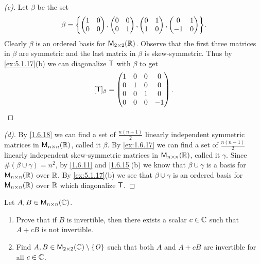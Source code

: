 \begin{proof}[(c)]
  Let \(\beta\) be the set
  \[
    \beta = \set{\begin{pmatrix}
        1 & 0 \\
        0 & 0
      \end{pmatrix}, \begin{pmatrix}
        0 & 0 \\
        0 & 1
      \end{pmatrix}, \begin{pmatrix}
        0 & 1 \\
        1 & 0
      \end{pmatrix}, \begin{pmatrix}
        0  & 1 \\
        -1 & 0
      \end{pmatrix}}.
  \]
  Clearly \(\beta\) is an ordered basis for \(\ms[2][2][\R]\).
  Observe that the first three matrices in \(\beta\) are symmetric and the last matrix in \(\beta\) is skew-symmetric.
  Thus by \cref{ex:5.1.17}(b) we can diagonalize \(\mathsf{T}\) with \(\beta\) to get
  \[
    [\mathsf{T}]_{\beta} = \begin{pmatrix}
      1 & 0 & 0 & 0  \\
      0 & 1 & 0 & 0  \\
      0 & 0 & 1 & 0  \\
      0 & 0 & 0 & -1
    \end{pmatrix}.
  \]
\end{proof}

\begin{proof}[(d)]
  By \cref{1.6.18} we can find a set of \(\frac{n(n + 1)}{2}\) linearly independent symmetric matrices in \(\ms[n][n][\R]\), called it \(\beta\).
  By \cref{ex:1.6.17} we can find a set of \(\frac{n(n - 1)}{2}\) linearly independent skew-symmetric matrices in \(\ms[n][n][\R]\), called it \(\gamma\).
  Since \(\#(\beta \cup \gamma) = n^2\), by \cref{1.6.11} and \cref{1.6.15}(b) we know that \(\beta \cup \gamma\) is a basis for \(\ms[n][n][\R]\) over \(\mathbb{R}\).
  By \cref{ex:5.1.17}(b) we see that \(\beta \cup \gamma\) is an ordered basis for \(\ms[n][n][\R]\) over \(\mathbb{R}\) which diagonalize \(\mathsf{T}\).
\end{proof}

\begin{ex}\label{ex:5.1.18}
  Let \(A, B \in \ms[n][n][\C]\).
  \begin{enumerate}
    \item Prove that if \(B\) is invertible, then there exists a scalar \(c \in \mathbb{C}\) such that \(A + cB\) is not invertible.
    \item Find \(A, B \in \ms[2][2][\C] \setminus \set{\zm}\) such that both \(A\) and \(A + cB\) are invertible for all \(c \in \mathbb{C}\).
  \end{enumerate}
\end{ex}

